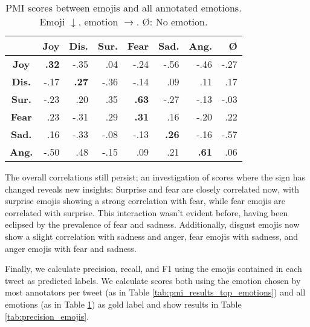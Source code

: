 \documentclass[10pt, a4paper]{article}
\begin{document}
\begin{table}[!ht]
\centering
\begin{tabular}{c | r | r | r |%
%
%
 r | r | r | r}
 & \textbf{Joy} & \textbf{Dis.} & \textbf{Sur.} & \textbf{Fear} & \textbf{Sad.} & \textbf{Ang.} & \textbf{\O} \\\hline
\textbf{Joy} & \textbf{.32} & -.35 & .04 & -.24 & -.56 & -.46 & -.27 \\
\textbf{Dis.} & -.17 & \textbf{.27} & -.36 & -.14 & .09 & .11 & .17 \\
\textbf{Sur.} & -.23 & .20 & .35 & \textbf{.63} & -.27 & -.13 & -.03 \\
\textbf{Fear} & .23 & -.31 & .29 & \textbf{.31} & .16 & -.20 & .22 \\
\textbf{Sad.} & .16 & -.33 & -.08 & -.13 & \textbf{.26} & -.16 & -.57 \\
\textbf{Ang.} & -.50 & .48 & -.15 & .09 & .21 & \textbf{.61} & .06
\end{tabular}
\caption{PMI scores between emojis and all annotated emotions. Emoji $\downarrow$, emotion $\rightarrow$. \O: No emotion.}
\label{tab:pmi_results_all_emotions}
\end{table}

The overall correlations still persist; an investigation of scores where the sign has changed reveals new insights: Surprise and fear are closely correlated now, with surprise emojis showing a strong correlation with fear, while fear emojis are correlated with surprise. This interaction wasn't evident before, having been eclipsed by the prevalence of fear and sadness. Additionally, disgust emojis now show a slight correlation with sadness and anger, fear emojis with sadness, and anger emojis with fear and sadness.

Finally, we calculate precision, recall, and F1 using the emojis contained in each tweet as predicted labels. We calculate scores both using the emotion chosen by most annotators per tweet (as in Table \ref{tab:pmi_results_top_emotions}) and all emotions (as in Table \ref{tab:pmi_results_all_emotions}) as gold label and show results in Table \ref{tab:precision_emojis}.
\end{document}
